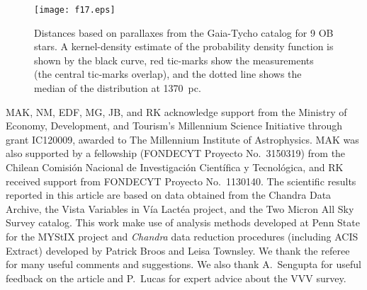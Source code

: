 \documentclass[twocolumn,tighten]{aastex61}
\newcounter{column_number}
\begin{document}
\begin{figure}[h]
\centering
\texttt{[image: f17.eps]} 
\caption{Distances based on parallaxes from the Gaia-Tycho catalog for 9 OB stars. A kernel-density estimate of the probability density function is shown by the black curve, red tic-marks show the measurements (the central tic-marks overlap), and the dotted line shows the median of the distribution at 1370~pc. \label{distance.fig}}
\end{figure}

\newpage
\onecolumngrid
\acknowledgments MAK, NM, EDF, MG, JB, and RK acknowledge support from the Ministry of Economy, Development, and Tourism's Millennium Science Initiative through grant IC120009, awarded to The Millennium Institute of Astrophysics. MAK was also supported by a fellowship (FONDECYT Proyecto No.\ 3150319) from the Chilean Comisi\'on Nacional de Investigaci\'on Cient\'ifica y Tecnol\'ogica, and RK received support from FONDECYT Proyecto No.\ 1130140. The scientific results reported in this article are based on data obtained from the Chandra Data Archive, the Vista Variables in V\'ia Lact\'ea project, and the Two Micron All Sky Survey catalog.
This work make use of analysis methods developed at Penn State for the MYStIX project and {\it Chandra} data reduction procedures (including ACIS Extract) developed by Patrick Broos and Leisa Townsley. 
We thank the referee for many useful comments and suggestions. We also thank A.\ Sengupta for useful feedback on the article and P.\ Lucas for expert advice about the VVV survey. 







\end{document}
